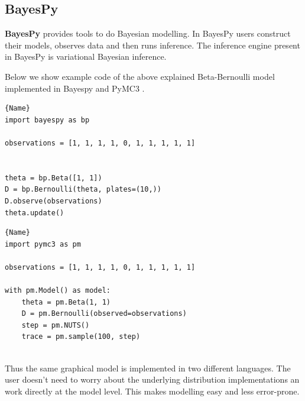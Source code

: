 \subsection{BayesPy}

\textbf{BayesPy} provides tools to do Bayesian modelling. In BayesPy users construct their models, observes data and then runs inference. The inference engine present in BayesPy is variational Bayesian inference.

Below we show example code of the above explained Beta-Bernoulli model implemented in Bayespy and PyMC3 .

\noindent\begin{minipage}{.46\textwidth}
\begin{lstlisting}[caption=BayesPy Code,frame=tlrb]{Name}
import bayespy as bp

observations = [1, 1, 1, 1, 0, 1, 1, 1, 1, 1]


theta = bp.Beta([1, 1])
D = bp.Bernoulli(theta, plates=(10,))
D.observe(observations)
theta.update()

\end{lstlisting}
\end{minipage}\hfill
\begin{minipage}{.46\textwidth}
\begin{lstlisting}[caption=PyMC3 code,frame=tlrb]{Name}
import pymc3 as pm

observations = [1, 1, 1, 1, 0, 1, 1, 1, 1, 1]

with pm.Model() as model:
    theta = pm.Beta(1, 1)
    D = pm.Bernoulli(observed=observations)
    step = pm.NUTS() 
    trace = pm.sample(100, step)
    
\end{lstlisting}

\end{minipage}


Thus the same graphical model is implemented in two different languages. The user doesn't need to worry about the underlying distribution implementations an work directly at the model level. This makes modelling easy and less error-prone. 